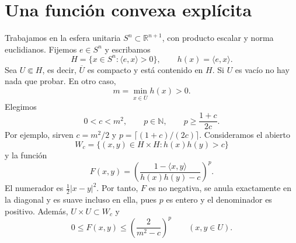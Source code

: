 \documentclass[11pt,a4paper]{article}
\newcommand{\R}{\mathbb R}
\begin{document}
\section{Una función convexa explícita}
Trabajamos en la esfera unitaria $S^n\subset\R^{n+1}$, con producto escalar y norma euclidianos. Fijemos $e\in S^n$ y escribamos
\[
 H=\{x\in S^n:\langle e,x\rangle>0\},\qquad
 h(x)=\langle e,x\rangle.
\]
Sea $U\Subset H$, es decir, $\overline U$ es compacto y está contenido en $H$. Si $U$ es vacío no hay nada que probar. En otro caso,
\[
 m=\min_{x\in\overline U}h(x)>0.
\]
Elegimos
\begin{equation}\label{eq:parameters}
 0<c<m^2,\qquad p\in\mathbb N,\qquad
 p\geq\frac{1+c}{2c}.
\end{equation}
Por ejemplo, sirven $c=m^2/2$ y $p=\lceil(1+c)/(2c)\rceil$. Consideramos el abierto
\[
 W_c=\{(x,y)\in H\times H:h(x)h(y)>c\}
\]
y la función
\begin{equation}\label{eq:F}
 F(x,y)=\left(\frac{1-\langle x,y\rangle}{h(x)h(y)-c}\right)^p.
\end{equation}
El numerador es $\frac12|x-y|^2$. Por tanto, $F$ es no negativa, se anula exactamente en la diagonal y es suave incluso en ella, pues $p$ es entero y el denominador es positivo. Además, $U\times U\subset W_c$ y
\begin{equation}\label{eq:bound}
 0\leq F(x,y)\leq\left(\frac{2}{m^2-c}\right)^p
 \qquad (x,y\in U).
\end{equation}
\end{document}
